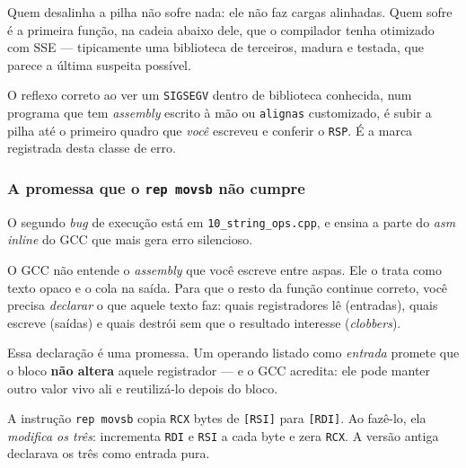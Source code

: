 \begin{armadilha}
Quem desalinha a pilha não sofre nada: ele não faz cargas alinhadas. Quem sofre
é a primeira função, na cadeia abaixo dele, que o compilador tenha otimizado
com SSE --- tipicamente uma biblioteca de terceiros, madura e testada, que
parece a última suspeita possível.

O reflexo correto ao ver um \texttt{SIGSEGV} dentro de biblioteca conhecida, num
programa que tem \emph{assembly} escrito à mão ou \texttt{alignas} customizado,
é subir a pilha até o primeiro quadro que \emph{você} escreveu e conferir o
\texttt{RSP}. É a marca registrada desta classe de erro.
\end{armadilha}

\subsubsection{A promessa que o \texttt{rep movsb} não cumpre}

O segundo \emph{bug} de execução está em \texttt{10\_string\_ops.cpp}, e ensina
a parte do \emph{asm} \emph{inline} do GCC que mais gera erro silencioso.

\begin{porque}
O GCC não entende o \emph{assembly} que você escreve entre aspas. Ele o trata
como texto opaco e o cola na saída. Para que o resto da função continue
correto, você precisa \emph{declarar} o que aquele texto faz: quais
registradores lê (entradas), quais escreve (saídas) e quais destrói sem que o
resultado interesse (\emph{clobbers}).

Essa declaração é uma promessa. Um operando listado como \emph{entrada} promete
que o bloco \textbf{não altera} aquele registrador --- e o GCC acredita: ele
pode manter outro valor vivo ali e reutilizá-lo depois do bloco.
\end{porque}

A instrução \texttt{rep movsb} copia \texttt{RCX} bytes de \texttt{[RSI]} para
\texttt{[RDI]}. Ao fazê-lo, ela \emph{modifica os três}: incrementa
\texttt{RDI} e \texttt{RSI} a cada byte e zera \texttt{RCX}. A versão antiga
declarava os três como entrada pura.

